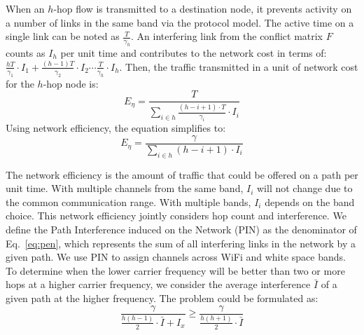 When an $h$-hop flow is transmitted to a destination node, it prevents 
activity on a number of links in the same band via the protocol model. 
The active time on a single link can be noted as 
$\frac{T}{\gamma_h}$. 
An interfering link from the conflict matrix $F$ counts as $I_h$ per unit time
and contributes to the network cost in terms of:
$\frac{hT}{\gamma_1}\cdot I_1 + \frac{(h-1)T}{\gamma_2}\cdot I_2 \cdots \frac{T}{\gamma_h}\cdot I_h$.
Then, the traffic transmitted in a unit of network cost for the $h$-hop node is:
\begin{equation}
\label{eq:originpen}
E_{\eta}=\frac{T}{\sum_{i \in h}\frac{(h-i+1)\cdot T}{\gamma_i}\cdot I_i }
\end{equation}
Using network efficiency, the equation simplifies to:
\begin{equation}
\label{eq:pen}
E_{\eta}=\frac{\gamma}{\sum_{i \in h} (h-i+1)\cdot I_i}
\end{equation}

The network efficiency is the amount of traffic that could be 
offered on a path per unit time. With multiple channels from the same band,
$I_i$ will not change due to the common communication range. With multiple
bands, $I_i$ depends on the band choice.  
This network efficiency jointly considers hop count and interference. We define
the Path Interference induced on the Network (PIN) as the denominator of Eq.~\ref{eq:pen},
which represents the sum of all interfering links in the network by a given path. We
use PIN to assign channels
across WiFi and white space bands.
To determine when the lower carrier frequency will be better than two or more hops at a
higher carrier frequency, we consider the average interference $\bar{I}$ of a given path
at the higher frequency.  The problem could be formulated as:
\begin{equation}
\label{eq:benefit}
\frac{\gamma}{\frac{h(h-1)}{2}\cdot \bar{I}+I_x} \geq \frac{\gamma}{\frac{h(h+1)}{2}\cdot \bar{I}}
\end{equation}

